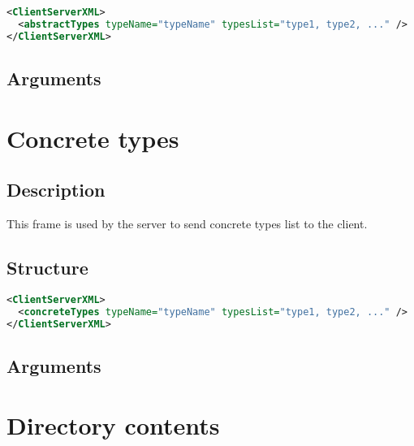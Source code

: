 \begin{lstlisting}[language=XML]
<ClientServerXML>
  <abstractTypes typeName="typeName" typesList="type1, type2, ..." />
</ClientServerXML>
\end{lstlisting}

\subsection{Arguments}


\section{Concrete types}
\label{concreteTypes}

\subsection{Description}

This frame is used by the server to send concrete types list to the client.

\subsection{Structure}

\begin{lstlisting}[language=XML]
<ClientServerXML>
  <concreteTypes typeName="typeName" typesList="type1, type2, ..." />
</ClientServerXML>
\end{lstlisting}

\subsection{Arguments}


\section{Directory contents}
\label{dirContent}

